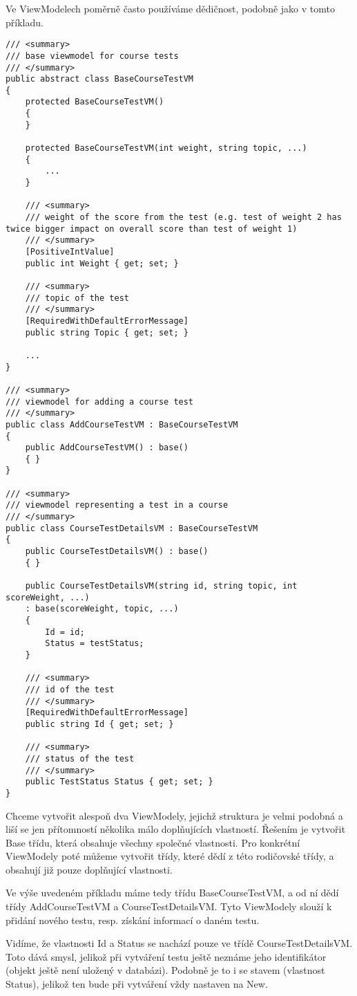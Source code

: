 Ve ViewModelech poměrně často používáme dědičnost, podobně jako v tomto příkladu.
\begin{lstlisting}
/// <summary>
/// base viewmodel for course tests
/// </summary>
public abstract class BaseCourseTestVM
{
	protected BaseCourseTestVM()
	{
	}
	
	protected BaseCourseTestVM(int weight, string topic, ...)
	{
		...
	}
	
	/// <summary>
	/// weight of the score from the test (e.g. test of weight 2 has twice bigger impact on overall score than test of weight 1)
	/// </summary>
	[PositiveIntValue]
	public int Weight { get; set; }
	
	/// <summary>
	/// topic of the test
	/// </summary>
	[RequiredWithDefaultErrorMessage]
	public string Topic { get; set; }

	...
}

/// <summary>
/// viewmodel for adding a course test
/// </summary>
public class AddCourseTestVM : BaseCourseTestVM
{
	public AddCourseTestVM() : base()
	{ }
}

/// <summary>
/// viewmodel representing a test in a course
/// </summary>
public class CourseTestDetailsVM : BaseCourseTestVM
{
	public CourseTestDetailsVM() : base()
	{ }
	
	public CourseTestDetailsVM(string id, string topic, int scoreWeight, ...)
	: base(scoreWeight, topic, ...)
	{
		Id = id;
		Status = testStatus;
	}
	
	/// <summary>
	/// id of the test
	/// </summary>
	[RequiredWithDefaultErrorMessage]
	public string Id { get; set; }
	
	/// <summary>
	/// status of the test
	/// </summary>
	public TestStatus Status { get; set; }
}
\end{lstlisting}
Chceme vytvořit alespoň dva ViewModely, jejichž struktura je velmi podobná a liší se jen přítomností několika málo doplňujících vlastností. Řešením je vytvořit Base třídu, která obsahuje všechny společné vlastnosti. Pro konkrétní ViewModely poté můžeme vytvořit třídy, které dědí z této rodičovské třídy, a obsahují již pouze doplňující vlastnosti.

Ve výše uvedeném příkladu máme tedy třídu BaseCourseTestVM, a od ní dědí třídy AddCourseTestVM a CourseTestDetailsVM. Tyto ViewModely slouží k přidání nového testu, resp. získání informací o daném testu.

Vidíme, že vlastnosti Id a Status se nachází pouze ve třídě CourseTestDetailsVM. Toto dává smysl, jelikož při vytváření testu ještě neznáme jeho identifikátor (objekt ještě není uložený v databázi).
Podobně je to i se stavem (vlastnost Status), jelikož ten bude při vytváření vždy nastaven na New.

